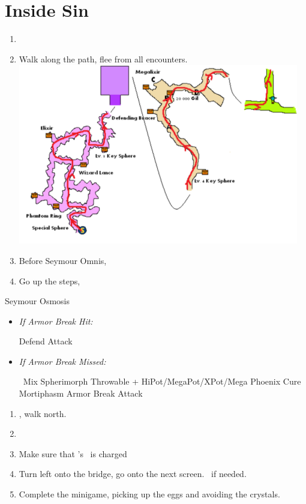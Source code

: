 \chapter{Inside Sin}
\begin{enumerate}
	\item \formation{\tidus}{\kimahri}{\auron}
	\item Walk along the path, flee from all encounters.
	\includegraphics{graphics/sinpath}
	\item Before Seymour Omnis, \formation{\tidus}{\yuna}{\auron}
	\item Go up the steps, \sd
\end{enumerate}
\begin{battle}[80000]{Seymour Osmosis}
\begin{itemize}
	\yunaf Defend
	\tidusf Armor Break
	\item \textit{If Armor Break Hit:}
	\begin{itemize}
		\auronf Defend
		\summon{\bahamut}
		\bahamutf Attack
	\end{itemize}
	\item \textit{If Armor Break Missed:}
	\begin{itemize}
		\switch{\auronf}{\rikku}
		\rikkuf \od\ Mix Spherimorph Throwable + HiPot/MegaPot/XPot/Mega Phoenix
		\yunaf Cure Mortiphasm
		\tidusf Armor Break
		\summon{\bahamut}
		\bahamutf Attack
	\end{itemize}
\end{itemize}
\end{battle}
\begin{enumerate}
	\item \sd, walk north.
	\item \formation{\tidus}{\kimahri}{\auron}
	\item Make sure that \rikku's \od\ is charged
	\item Turn left onto the bridge, go onto the next screen. \save\ if needed.
	\item Complete the minigame, picking up the eggs and avoiding the crystals.
\end{enumerate}
